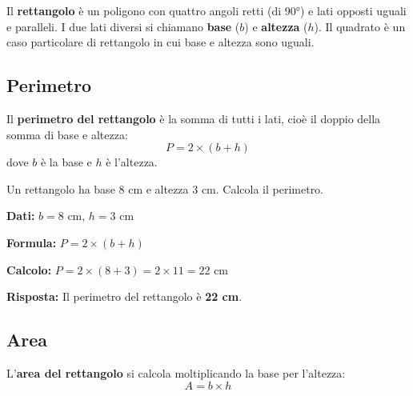 \begin{definizione}
    Il \textbf{rettangolo} è un poligono con quattro angoli retti (di 90°) e lati opposti uguali e paralleli. I due lati diversi si chiamano \textbf{base} ($b$) e \textbf{altezza} ($h$). Il quadrato è un caso particolare di rettangolo in cui base e altezza sono uguali.
\end{definizione}

\begin{center}
\end{center}

\subsection{Perimetro}

\begin{regola}
    Il \textbf{perimetro del rettangolo} è la somma di tutti i lati, cioè il doppio della somma di base e altezza:
    \[
        P = 2 \times (b + h)
    \]
    dove $b$ è la base e $h$ è l'altezza.
\end{regola}

\begin{esempio}
    Un rettangolo ha base 8 cm e altezza 3 cm. Calcola il perimetro.

    \medskip
    \textbf{Dati:} $b = 8$ cm, $h = 3$ cm

    \textbf{Formula:} $P = 2 \times (b + h)$

    \textbf{Calcolo:} $P = 2 \times (8 + 3) = 2 \times 11 = 22$ cm

    \textbf{Risposta:} Il perimetro del rettangolo è \textbf{22 cm}.
\end{esempio}

\subsection{Area}

\begin{regola}
    L'\textbf{area del rettangolo} si calcola moltiplicando la base per l'altezza:
    \[
        A = b \times h
    \]
\end{regola}


